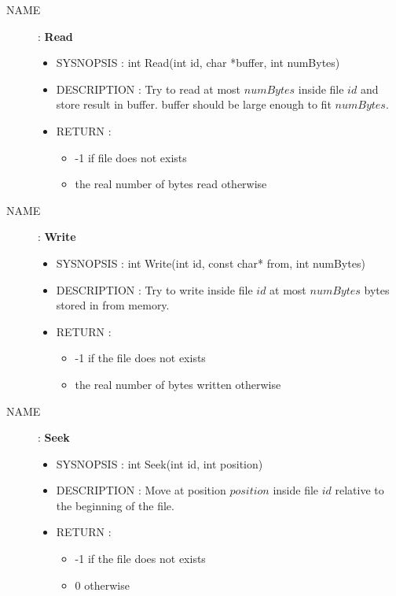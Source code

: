 \begin{description}
            \item [NAME] : \textbf{Read}
                \begin{itemize}
                    \item SYSNOPSIS : int Read(int id, char *buffer, int numBytes)
                    \item DESCRIPTION :
                        Try to read at most $numBytes$ inside file $id$ and store result in buffer.
                        buffer should be large enough to fit $numBytes$.
                    \item RETURN :
                        \begin{itemize}
                            \item -1 if file does not exists
                            \item the real number of bytes read otherwise
                        \end{itemize}
                \end{itemize}

            \item [NAME] : \textbf{Write}
                \begin{itemize}
                    \item SYSNOPSIS : int Write(int id, const char* from, int numBytes)
                    \item DESCRIPTION :
                        Try to write inside file $id$ at most $numBytes$ bytes stored in from
                        memory.
                    \item RETURN :
                        \begin{itemize}
                            \item -1 if the file does not exists
                            \item the real number of bytes written otherwise
                        \end{itemize}
                \end{itemize}

            \item [NAME] : \textbf{Seek}
                \begin{itemize}
                    \item SYSNOPSIS : int Seek(int id, int position)
                    \item DESCRIPTION :
                        Move at position $position$ inside file $id$ relative to the beginning of
                        the file.
                    \item RETURN :
                        \begin{itemize}
                            \item -1 if the file does not exists
                            \item 0 otherwise
                        \end{itemize}
                \end{itemize}


\end{description}
